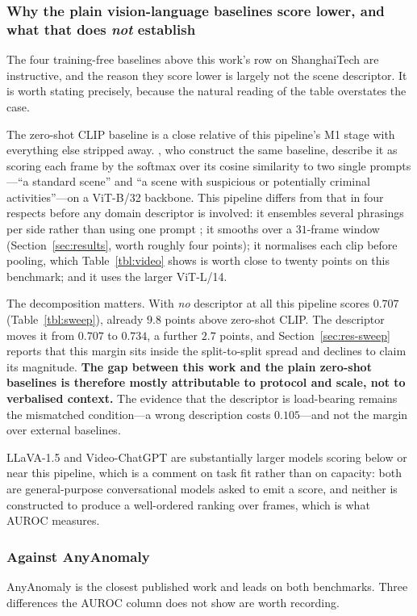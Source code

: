 \documentclass[a4paper,fleqn]{cas-sc}
\begin{document}
\subsubsection{Why the plain vision-language baselines score lower, and what
that does \emph{not} establish}
The four training-free baselines above this work's row on ShanghaiTech are
instructive, and the reason they score lower is largely not the scene
descriptor. It is worth stating precisely, because the natural reading of the
table overstates the case.

The zero-shot CLIP baseline is a close relative of this pipeline's M1 stage with
everything else stripped away. \citet{zanella2024lavad}, who construct the same
baseline, describe it as scoring each frame by the softmax over its cosine
similarity to two single prompts---``a standard scene'' and ``a scene with
suspicious or potentially criminal activities''---on a ViT-B/32 backbone. This
pipeline differs from that in four respects before any domain descriptor is
involved: it ensembles several phrasings per side rather than using one prompt
\citep{jeong2023winclip}; it smooths over a $31$-frame window
(Section~\ref{sec:results}, worth roughly four points); it normalises each clip
before pooling, which Table~\ref{tbl:video} shows is worth close to twenty
points on this benchmark; and it uses the larger ViT-L/14.

The decomposition matters. With \emph{no} descriptor at all this pipeline scores
$0.707$ (Table~\ref{tbl:sweep}), already $9.8$ points above zero-shot CLIP. The
descriptor moves it from $0.707$ to $0.734$, a further $2.7$ points, and
Section~\ref{sec:res-sweep} reports that this margin sits inside the
split-to-split spread and declines to claim its magnitude. \textbf{The gap
between this work and the plain zero-shot baselines is therefore mostly
attributable to protocol and scale, not to verbalised context.} The evidence
that the descriptor is load-bearing remains the mismatched condition---a wrong
description costs $0.105$---and not the margin over external baselines.

LLaVA-1.5 and Video-ChatGPT are substantially larger models scoring below or
near this pipeline, which is a comment on task fit rather than on capacity: both
are general-purpose conversational models asked to emit a score, and neither is
constructed to produce a well-ordered ranking over frames, which is what AUROC
measures.

\subsubsection{Against AnyAnomaly}
AnyAnomaly \citep{anyanomaly2025} is the closest published work and leads on
both benchmarks. Three differences the AUROC column does not show are worth
recording.
\end{document}
